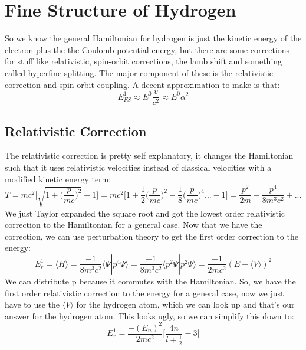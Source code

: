 \documentclass[garamond]{article}
\begin{document}
\section{Fine Structure of Hydrogen}
So we know the general Hamiltonian for hydrogen is just the kinetic energy of the electron plus the the Coulomb potential energy, but there are some corrections for stuff like relativistic, spin-orbit corrections, the lamb shift and something called hyperfine splitting. The major component of these is the relativistic correction and spin-orbit coupling. A decent approximation to make is that:
\begin{equation}
E_{FS}^1\approx E^0\frac{v}{c^2}\approx E^0\alpha^2
\end{equation}
\subsection{Relativistic Correction}
The relativistic correction is pretty self explanatory, it changes the Hamiltonian such that it uses relativistic velocities instead of classical velocities with a modified kinetic energy term:
\begin{equation}
T=mc^2\bigg[\sqrt{1+\Big(\frac{p}{mc}\Big)^2}-1\bigg]=mc^2\bigg[1+\frac{1}{2}\bigg(\frac{p}{mc}\bigg)^2-\frac{1}{8}\bigg(\frac{p}{mc}\bigg)^4...-1\bigg]=\frac{p^2}{2m}-\frac{p^4}{8m^3c^2}+...
\end{equation}
We just Taylor expanded the square root and got the lowest order relativistic correction to the Hamiltonian for a general case. Now that we have the correction, we can use perturbation theory to get the first order correction to the energy:
\begin{equation}
E_r^1=\langle H \rangle = \frac{-1}{8m^3c^2}\langle \Psi |p^4\Psi\rangle = \frac{-1}{8m^3c^2}\langle p^2\Psi |p^2\Psi\rangle=\frac{-1}{2mc^2} (E-\langle V\rangle)^2
\end{equation}
We can distribute p because it commutes with the Hamiltonian. So, we have the first order relativistic correction to the energy for a general case, now we just have to use the $\langle V\rangle$ for the hydrogen atom, which we can look up and that's our answer for the hydrogen atom. This looks ugly, so we can simplify this down to:
\begin{equation}
E_r^1=\frac{-(E_n)^2}{2mc^2}\bigg[\frac{4n}{l+\frac{1}{2}}-3\bigg]
\end{equation}
\end{document}
